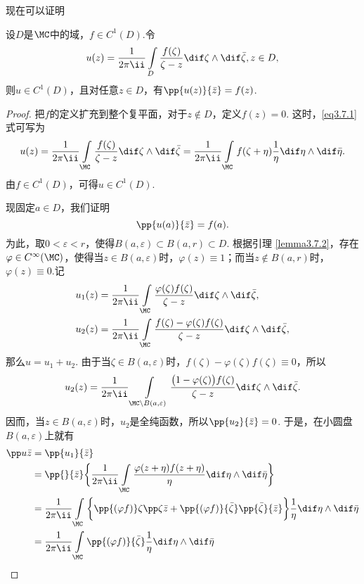 现在可以证明
\begin{theorem}\label{thm3.7.3}
设$D$是$\MC$中的域，$f\in C^1(D)$.令
\begin{equation}\label{eq3.7.1}
u(z)=\frac1{2\pi\ii}\int\limits_D\frac{f(\zeta)}{\zeta-z}\dif \zeta\wedge\dif \bar \zeta,z\in D,
\end{equation}
则$u\in C^1(D)$，且对任意$z\in D$，有$\pp{u(z)}{\bar z}=f(z)$.
\end{theorem}
\begin{proof}
把$f$的定义扩充到整个复平面，对于$z\notin D$，定义$f(z)=0$. 这时，\eqref{eq3.7.1} 式可写为
\[u(z)=\frac1{2\pi\ii}\int\limits_\MC\frac{f(\zeta)}{\zeta-z}\dif \zeta\wedge\dif \bar\zeta=\frac1{2\pi\ii}\int\limits_\MC f(\zeta+\eta)\frac1\eta\dif \eta\wedge\dif \bar\eta.\]
由$f\in C^1(D)$，可得$u\in C^1(D)$.

现固定$a\in D$，我们证明
\[\pp{u(a)}{\bar z}=f(a).\]
为此，取$0<\varepsilon<r$，使得$B(a,\varepsilon)\subset B(a,r)\subset D$. 根据引理 \ref{lemma3.7.2}，存在$\varphi\in C^\infty(\MC)$，使得当$z\in B(a,\varepsilon)$时，$\varphi(z)\equiv1$；而当$z\notin B(a,r)$时，$\varphi(z)\equiv0$.记
\begin{align*}
&u_1(z)=\frac1{2\pi\ii}\int\limits_\MC\frac{\varphi(\zeta)f(\zeta)}{\zeta-z}\dif \zeta\wedge\dif \bar \zeta,\\
&u_2(z)=\frac1{2\pi\ii}\int\limits_\MC\frac{f(\zeta)-\varphi(\zeta)f(\zeta)}{\zeta-z}\dif \zeta\wedge\dif \bar \zeta,
\end{align*}
那么$u=u_1+u_2$. 由于当$\zeta\in B(a,\varepsilon)$时，$f(\zeta)-\varphi(\zeta)f(\zeta)\equiv0$，所以
\[u_2(z)=\frac1{2\pi\ii}\int\limits_{\MC\backslash B(a,\varepsilon)}\frac{\big(1-\varphi(\zeta)\big)f(\zeta)}{\zeta-z}\dif \zeta\wedge\dif \bar \zeta.\]
因而，当$z\in B(a,\varepsilon)$时，$u_2$是全纯函数，所以$\pp{u_2}{\bar z}=0$. 于是，在小圆盘$B(a,\varepsilon)$上就有
\begin{equation}\label{eq3.7.2}
\begin{aligned}
\pp u{\bar z}&=\pp{u_1}{\bar z}\\
&=\pp{}{\bar z}\bigg\{\frac1{2\pi\ii}\int\limits_\MC\frac{\varphi(z+\eta)f(z+\eta)}\eta\dif \eta\wedge\dif \bar\eta\bigg\}\\
&=\frac1{2\pi\ii}\int\limits_\MC\bigg\{\pp{(\varphi f)}\zeta\pp\zeta{\bar z}+
\pp{(\varphi f)}{\bar \zeta}\pp{\bar \zeta}{\bar z}\bigg\}\frac1\eta\dif \eta\wedge\dif \bar\eta\\
&=\frac1{2\pi\ii}\int\limits_\MC\pp{(\varphi f)}{\bar\zeta}\frac1\eta\dif \eta\wedge\dif \bar\eta\\

\end{aligned}
\end{equation}
\end{proof}
